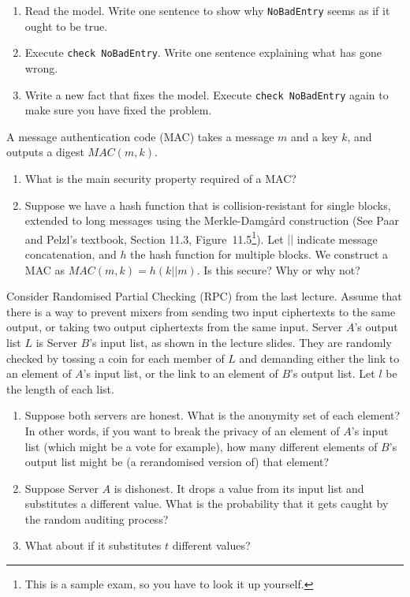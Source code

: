 \begin{enumerate}
\item Read the model.  Write one sentence to show why {\tt NoBadEntry} seems as if it ought to be true.
\item Execute {\tt check NoBadEntry}.  Write one sentence explaining what has gone wrong.
\item Write a new fact that fixes the model.  Execute {\tt check NoBadEntry} again to make sure you have fixed the problem.
\end{enumerate}





                   	A message authentication code (MAC) takes a message $m$ and a key $k$, and outputs a digest $\textit{MAC}(m,k)$.
				\begin{enumerate}
					\item What is the main security property required of a MAC?
					\item Suppose we have a  hash function that is collision-resistant for single blocks, extended to long messages using the Merkle-Damg{\aa}rd construction (See Paar and Pelzl's textbook, Section 11.3, Figure~11.5\footnote{This is a sample exam, so you have to look it up yourself.}).  Let $||$ indicate message concatenation, and $h$ the hash function for multiple blocks.  We construct a MAC as $\textit{MAC}(m,k) = h(k || m)$.  Is this secure?  Why or why not?
				\end{enumerate}

			 Consider Randomised Partial Checking (RPC) from the last lecture.  Assume that there is a way to prevent mixers from sending two input ciphertexts to the same output, or taking two output ciphertexts from the same input.  Server $A$'s output list $L$ is Server $B$'s input list, as shown in the lecture slides.  They are randomly checked by tossing a coin for each member of $L$ and demanding either the link to an element of $A$'s input list, or the link to an element of $B$'s output list.  Let $l$ be the length of each list.
				\begin{enumerate}
					\item Suppose both servers are honest.  What is the anonymity set of each element?  In other words, if you want to break the privacy of an element of $A$'s input list (which might be a vote for example), how many different elements of $B$'s output list might be (a rerandomised version of) that element?
					\item Suppose Server $A$ is dishonest.  It drops a value from its input list and substitutes a different value.  What is the probability that it gets caught by the random auditing process?
					\item What about if it substitutes $t$ different values?    
				\end{enumerate}

